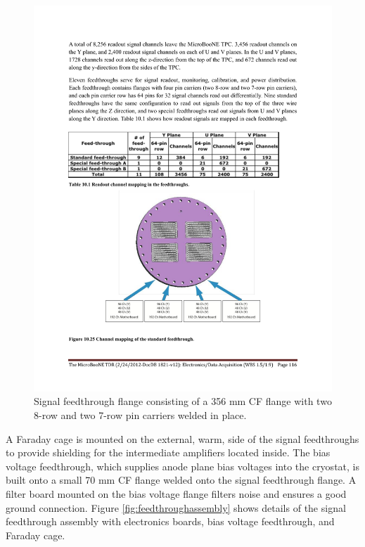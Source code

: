 \begin{figure}[hbt]
\begin{center}
\includegraphics[width=0.8\linewidth]{figures/signal_feedthrough_standard.pdf}
\end{center}
\caption{\label{fig:feedthroughflange}Signal feedthrough flange consisting of a 356 mm CF flange with two 8-row and two 7-row pin carriers welded in place.}
\end{figure}

A Faraday cage is mounted on the external, warm, side of the signal feedthroughs to provide shielding for the intermediate amplifiers located inside.  The bias voltage feedthrough, which supplies anode plane bias voltages into the cryostat, is built onto a small 70 mm CF flange welded onto the signal feedthrough flange. A filter board mounted on the bias voltage flange filters noise and ensures a good ground connection. Figure \ref{fig:feedthroughassembly} shows details of the signal feedthrough assembly with electronics boards, bias voltage feedthrough, and Faraday cage.

